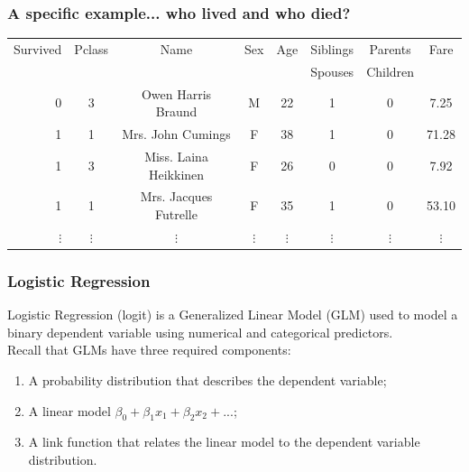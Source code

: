 \documentclass[aspectratio=169]{beamer}
\begin{document}
\begin{frame}
\frametitle{A specific example... who lived and who died?}

\begin{table}
\begin{tabular}{r | c | c | c | c | c | c | c}
Survived & Pclass  & Name & Sex & Age & Siblings & Parents & Fare\\
 &   &  &  &  & Spouses & Children & \\
\hline \hline
0 & 3 & Owen Harris Braund &M&22&1&0&7.25\\ 
 1 & 1 & Mrs. John Cumings &F&38&1&0&71.28\\ 
  1 & 3 & Miss. Laina Heikkinen &F&26&0&0&7.92\\ 
   1 & 1 & Mrs. Jacques Futrelle &F&35&1&0&53.10\\ 
   $\vdots$ & $\vdots$ & $\vdots$ &$\vdots$&$\vdots$&$\vdots$&$\vdots$&$\vdots$\\ 
\end{tabular}
\end{table}

\end{frame}

\begin{frame}
\frametitle{Logistic Regression}

Logistic Regression (logit) is a Generalized Linear Model (GLM) used to model a binary dependent variable using numerical and categorical predictors.\\
\bigskip
{} Recall that GLMs have three required components:
\begin{enumerate}
\item A probability distribution that describes the dependent variable;
\item A linear model $\beta_0 + \beta_1x_1 + \beta_2x_2 + ...$;
\item A link function that relates the linear model to the dependent variable distribution.
\end{enumerate}

\end{frame}
\end{document}
